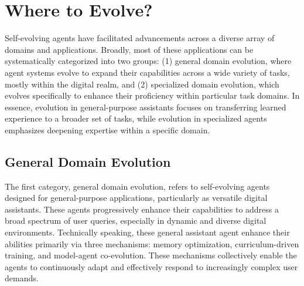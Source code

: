 \section{Where to Evolve?}
\label{sec:applications}

Self-evolving agents have facilitated advancements across a diverse array of domains and applications. 
Broadly, most of these applications can be systematically categorized into two groups: 
(1) general domain evolution, where agent systems evolve to expand their capabilities across a wide variety of tasks, mostly within the digital realm, and 
(2) specialized domain evolution, which evolves specifically to enhance their proficiency within particular task domains. 
In essence, evolution in general-purpose assistants focuses on transferring learned experience to a broader set of tasks, while evolution in specialized agents emphasizes deepening expertise within a specific domain.


\subsection{General Domain Evolution}

The first category, general domain evolution, refers to self-evolving agents designed for general-purpose applications, particularly as versatile digital assistants. These agents progressively enhance their capabilities to address a broad spectrum of user queries, especially in dynamic and diverse digital environments.
Technically speaking, these general assistant agent enhance their abilities primarily via three mechanisms: 
memory optimization, curriculum-driven training, and model-agent co‑evolution. 
These mechanisms collectively enable the agents to continuously adapt and effectively respond to increasingly complex user demands. 

